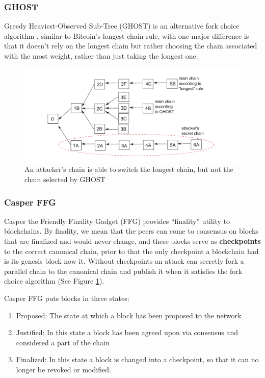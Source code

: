 \documentclass[12pt,twocolumn]{article}
\begin{document}
\subsubsection{GHOST}
Greedy Heaviest-Observed Sub-Tree (GHOST) is an alternative fork choice algorithm \cite{ghost}, similar to Bitcoin's longest chain rule,
with one major difference is that it doesn't rely on the longest chain but rather choosing the chain associated with the most weight, rather
than just taking the longest one.

\begin{figure}[h]
    \includegraphics[width=\linewidth]{fig/ghost.png}
    \caption{\label{fork_attack}An attacker's chain is able to switch the longest chain, but not the chain selected by GHOST \cite{ghost}}
\end{figure}

\subsubsection{Casper FFG}
Casper the Friendly Finality Gadget (FFG) provides ``finality'' utility to blockchains. By finality, we mean
that the peers can come to consensus on blocks that are finalized and would never change, and these blocks
serve as \textbf{checkpoints} to the correct canonical chain, prior to that the only checkpoint a blockchain had is
its genesis block now it. Without checkpoints an attack can secretly fork a parallel chain to the canonical chain
and publish it when it satisfies the fork choice algorithm (See Figure \ref{fork_attack}).

Casper FFG puts blocks in three states:
\begin{enumerate}
    \item Proposed: The state at which a block has been proposed to the network
    \item Justified: In this state a block has been agreed upon via consensus and considered a part of the chain
    \item Finalized: In this state a block is changed into a checkpoint, so that it can no longer be revoked or modified.
\end{enumerate}
\end{document}
